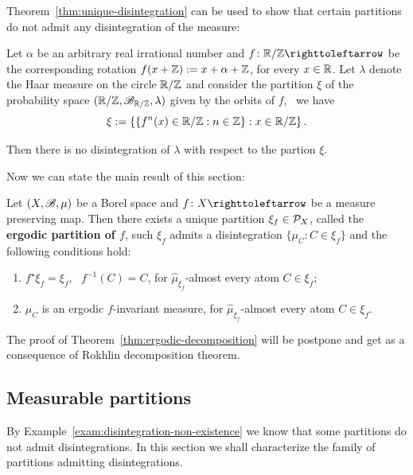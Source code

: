 Theorem~\ref{thm:unique-disintegration} can be used to show that certain partitions do not admit any disintegration of the measure:

\begin{example}\label{exam:disintegration-non-existence}
  Let $\alpha$ be an arbitrary real irrational number and $f\colon\R/\Z\carr$ be the corresponding rotation $f(x+\mathbb{Z}):=x+\alpha+\mathbb{Z}$, for every $x\in\mathbb{R}$. Let $\lambda$ denote the Haar measure on the circle $\mathbb{R}/\mathbb{Z}$ and consider the partition $\xi$ of the probability space $(\mathbb{R}/\mathbb{Z},\mathscr{B}_{\mathbb{R}/\mathbb{Z}},\lambda)$ given by the orbits of $f$, \ie~we have
  \begin{displaymath}
    \xi:=\left\{\{f^{n}(x)\in\mathbb{R}/\mathbb{Z} : n\in\mathbb{Z}\} : x\in\mathbb{R}/\mathbb{Z}\right\}.
  \end{displaymath}

  Then there is no disintegration of $\lambda$ with respect to the partion $\xi$.
\end{example}

Now we can state the main result of this section:

\begin{theorem}\label{thm:ergodic-decomposition}
  Let $(X,\mathscr{B},\mu)$ be a Borel space and $f\colon X\carr$ be a measure preserving map. Then there exists a unique partition $\xi_{f}\in\mathcal{P}_{X}$, called the \textbf{ergodic partition of $f$}, such $\xi_{f}$ admits a disintegration $\{\mu_{C} : C\in\xi_{f}\}$ and the following conditions hold:
  \begin{enumerate}
    \item $f^{\star}\xi_{f}=\xi_{f}$, \ie~$f^{-1}(C)=C$, for $\hat\mu_{\xi_{f}}$-almost every atom $C\in\xi_{f}$;
    \item $\mu_{C}$ is an ergodic $f$-invariant measure, for $\hat\mu_{\xi_{f}}$-almost every atom $C\in\xi_{f}$.
  \end{enumerate}
\end{theorem}

The proof of Theorem~\ref{thm:ergodic-decomposition} will be postpone and get as a consequence of Rokhlin decomposition theorem.

\subsection{Measurable partitions}\label{sec:measurable-partitions}

By Example~\ref{exam:disintegration-non-existence} we know that some partitions do not admit disintegrations. In this section we shall characterize the family of partitions admitting disintegrations.

